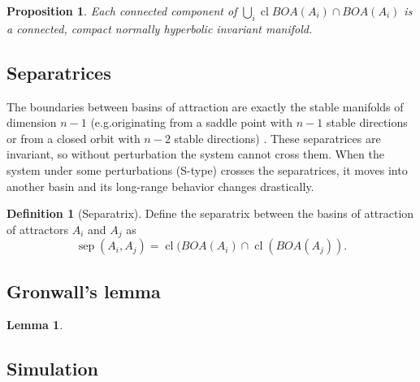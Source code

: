 \documentclass{article}
\newtheorem{proposition}{Proposition}
\newtheorem{lemma}{Lemma}
\theoremstyle{definition}
\newtheorem{definition}{Definition}
\theoremstyle{remark}
\newcommand{\sep}{\operatorname{sep}}
\newcommand{\cl}{\operatorname{cl}}
\newcounter{ct}
\begin{document}
\begin{proposition}
Each connected component of $\bigcup_i\cl BOA(A_i) \cap BOA(A_i) $ is a connected, compact normally hyperbolic invariant manifold. %
\end{proposition}


\subsection{Separatrices}
The boundaries between basins of attraction are exactly the stable manifolds of dimension $n-1$ (e.g.originating from a saddle point with $n-1$ stable directions 
or from a closed orbit with $n-2$ stable directions) \citep{gruemm1975stable}.
These separatrices are invariant, so without  perturbation the system cannot cross them.
When the system under some perturbations (S-type) crosses the separatrices, it moves into another basin and its long-range behavior changes drastically.

\begin{definition}[Separatrix]\label{def:separatrix}
Define the separatrix between the basins of attraction of attractors $A_i$ and $A_j$ as 
\begin{equation}
\sep(A_i,A_j) = \cl(BOA(A_i)\cap \cl(BOA(A_j)).
\end{equation}
\end{definition}


\subsection{Gronwall's lemma}\label{sec:gronwall}
\begin{lemma}\label{lemma:gronwall}

\end{lemma}


\subsection{Simulation}\label{sec:simulation}
\citep{sontag1992neural}
\end{document}
